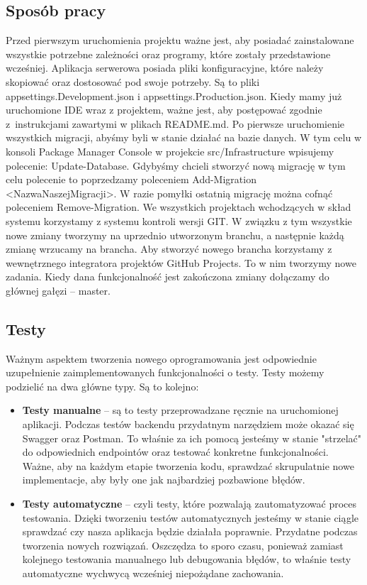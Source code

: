 \documentclass[a4paper,twoside,12pt]{book}
\begin{document}
\subsection{Sposób pracy}
Przed pierwszym uruchomienia projektu ważne jest, aby posiadać zainstalowane wszystkie potrzebne zależności oraz programy, które zostały przedstawione wcześniej. Aplikacja serwerowa posiada pliki konfiguracyjne, które należy skopiować oraz dostosować pod swoje potrzeby. Są to pliki appsettings.Development.json i appsettings.Production.json. Kiedy mamy już uruchomione IDE wraz z projektem, ważne jest, aby postępować zgodnie z~instrukcjami zawartymi w plikach README.md. Po pierwsze uruchomienie wszystkich migracji, abyśmy byli w stanie działać na bazie danych. W tym celu w konsoli Package Manager Console w projekcie src/Infrastructure wpisujemy polecenie: Update-Database. Gdybyśmy chcieli stworzyć nową migrację w tym celu polecenie to poprzedzamy poleceniem Add-Migration <NazwaNaszejMigracji>. W razie pomyłki ostatnią migrację można cofnąć poleceniem Remove-Migration. We wszystkich projektach wchodzących w skład systemu korzystamy z systemu kontroli wersji GIT. W związku z tym wszystkie nowe zmiany tworzymy na uprzednio utworzonym branchu, a następnie każdą zmianę wrzucamy na brancha. Aby stworzyć nowego brancha korzystamy z wewnętrznego integratora projektów GitHub Projects. To w nim tworzymy nowe zadania. Kiedy dana funkcjonalność jest zakończona zmiany dołączamy do głównej gałęzi -- master. 

\subsection{Testy}
Ważnym aspektem tworzenia nowego oprogramowania jest odpowiednie uzupełnienie zaimplementowanych funkcjonalności o testy. Testy możemy podzielić na dwa główne typy.
Są to kolejno:
\begin{itemize}
    \item \textbf{Testy manualne} -- są to testy przeprowadzane ręcznie na uruchomionej aplikacji. Podczas testów backendu przydatnym narzędziem może okazać się Swagger oraz Postman. To właśnie za ich pomocą jesteśmy w stanie "strzelać" do odpowiednich endpointów oraz testować konkretne funkcjonalności. Ważne, aby na każdym etapie tworzenia kodu, sprawdzać skrupulatnie nowe implementacje, aby były one jak najbardziej pozbawione błędów.
    \item \textbf{Testy automatyczne} -- czyli testy, które pozwalają zautomatyzować proces testowania. Dzięki tworzeniu testów automatycznych jesteśmy w stanie ciągle sprawdzać czy nasza aplikacja będzie działała poprawnie. Przydatne podczas tworzenia nowych rozwiązań. Oszczędza to sporo czasu, ponieważ zamiast kolejnego testowania manualnego lub debugowania błędów, to właśnie testy automatyczne wychwycą wcześniej niepożądane zachowania.
\end{itemize}
\end{document}
